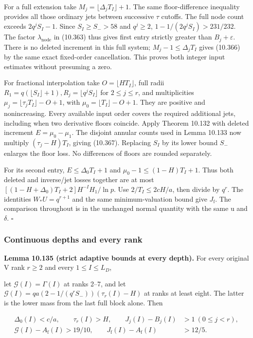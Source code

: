 \documentclass[
  11pt,
  a4paper,
]{article}
\begin{document}
For a full extension take \(M_j=\lfloor\Delta_jT_I\rfloor+1\). The same
floor-difference inequality provides all those ordinary jets between
successive \(\tau\) cutoffs. The full node count exceeds \(2q^jS_I-1\).
Since \(S_I\ge S_->58\) and \(q^j\ge2\), \(1-1/(2q^jS_I)>231/232\). The
factor \(\lambda_{\mathrm{node}}\) in (10.363) thus gives first entry
strictly greater than \(B_j+\varepsilon\). There is no deleted increment
in this full system; \(M_j-1\le\Delta_jT_I\) gives (10.366) by the same
exact fixed-order cancellation. This proves both integer input estimates
without presuming a zero.

For fractional interpolation take \(O=\lfloor HT_I\rfloor\), full radii
\(R_1=q(\lfloor S_I\rfloor+1),R_j=\lfloor q^jS_I\rfloor\) for
\(2\le j\le r\), and multiplicities
\(\mu_j=\lfloor\tau_jT_I\rfloor-O+1\), with
\(\mu_0=\lfloor T_I\rfloor-O+1\). They are positive and nonincreasing.
Every available input order covers the required additional jets,
including when two derivative floors coincide. Apply Theorem 10.132 with
deleted increment \(E=\mu_0-\mu_1\). The disjoint annular counts used in
Lemma 10.133 now multiply \((\tau_j-H)T_I\), giving (10.367). Replacing
\(S_I\) by its lower bound \(S_-\) enlarges the floor loss. No
differences of floors are rounded separately.

For its second entry, \(E\le\Delta_0T_I+1\) and
\(\mu_0-1\le(1-H)T_I+1\). Thus both deleted and inverse/jet losses
together are at most \([(1-H+\Delta_0)T_I+2]H^{-I}H_1/\ln p\). Use
\(2/T_I\le2cH/a\), then divide by \(q^r\). The identities
\(W_*U=q^{r+1}\) and the same minimum-valuation bound give
\(J_{\mathrm f}\). The comparison throughout is in the unchanged normal
quantity with the same u and \(\delta\). \(\square\)

\subsubsection{Continuous depths and every
rank}\label{continuous-depths-and-every-rank}

\textbf{Lemma 10.135 (strict adaptive bounds at every depth).} For every
original V rank \(r\ge2\) and every \(1\le I\le L_D\),

let \(\mathcal G(I)=\Gamma(I)\) at ranks 2--7, and let
\(\mathcal G(I)=qa(2-1/(q^rS_-))(\tau_r(I)-H)\) at ranks at least eight.
The latter is the lower mass from the last full block alone. Then

\[
\begin{aligned}
\Delta_0(I)<c/a,\qquad
\tau_r(I)>H,\qquad
J_j(I)-B_j(I)&>1\ (0\le j<r),\\
\mathcal G(I)-A_{\mathrm f}(I)>19/10,\qquad
J_{\mathrm f}(I)-A_{\mathrm f}(I)&>12/5.
\end{aligned}
\tag{10.368}
\]
\end{document}
